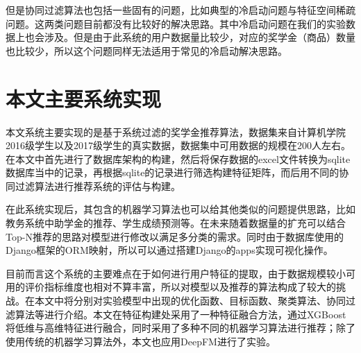 但是协同过滤算法也包括一些固有的问题，比如典型的冷启动问题与特征空间稀疏问题。这两类问题目前都没有比较好的解决思路。其中冷启动问题在我们的实验数据上也会涉及。但是由于此系统的用户数据量比较少，对应的奖学金（商品）数量也比较少，所以这个问题同样无法适用于常见的冷启动解决思路。

\section{本文主要系统实现}

本文系统主要实现的是基于系统过滤的奖学金推荐算法，数据集来自计算机学院2016级学生以及2017级学生的真实数据，数据集中可用数据的规模在200人左右。在本文中首先进行了数据库架构的构建，然后将保存数据的excel文件转换为sqlite数据库当中的记录，再根据sqlite的记录进行筛选构建特征矩阵，而后用不同的协同过滤算法进行推荐系统的评估与构建。

在此系统实现后，其包含的机器学习算法也可以给其他类似的问题提供思路，比如教务系统中助学金的推荐、学生成绩预测等。在未来随着数据量的扩充可以结合Top-N推荐的思路对模型进行修改以满足多分类的需求。同时由于数据库使用的Django框架的ORM映射，所以可以通过搭建Django的apps实现可视化操作。

目前而言这个系统的主要难点在于如何进行用户特征的提取，由于数据规模较小可用的评价指标维度也相对不算丰富，所以对模型以及推荐的算法构成了较大的挑战。在本文中将分别对实验模型中出现的优化函数、目标函数、聚类算法、协同过滤算法等进行介绍。本文在特征构建处采用了一种特征融合方法，通过XGBoost将低维与高维特征进行融合，同时采用了多种不同的机器学习算法进行推荐；除了使用传统的机器学习算法外，本文也应用DeepFM进行了实验。

